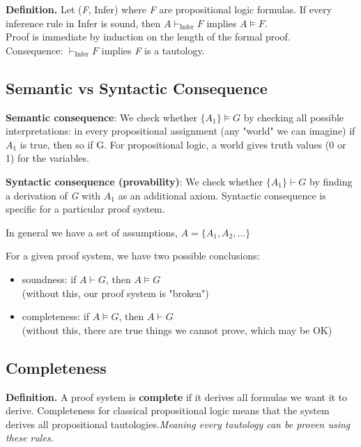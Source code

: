 \documentclass[11pt]{article}
\begin{document}
\begin{tcolorbox}[
    enhanced,
    frame hidden,
    borderline west={2pt}{0pt}{black},
    boxsep=5pt,
    left=8pt
]
\textbf{Definition.} Let (\textit{F}, Infer) where \textit{F} are propositional logic formulas. If every inference rule in Infer is sound, then $A \vdash_{\text{Infer}} F$ implies $A \models F$. \\

Proof is immediate by induction on the length of the formal proof. \\
Consequence: $\vdash_{\text{Infer}} F$ implies \textit{F} is a tautology. 
\end{tcolorbox}

\subsection*{Semantic vs Syntactic Consequence}
\textbf{Semantic consequence}: We check whether $\{ A_1 \} \models G$ by checking all possible interpretations: in every propositional assignment (any "world" we can imagine) if $A_1$ is true, then so if G. For propositional logic, a world gives truth values (0 or 1) for the variables. 

\textbf{Syntactic consequence (provability)}: We check whether $\{ A_1 \} \vdash G$ by finding a derivation of \textit{G} with $A_1$ as an additional axiom. Syntactic consequence is specific for a particular proof system. 

In general we have a set of assumptions, $A = \{A_1, A_2, ...\}$

For a given proof system, we have two possible conclusions:
\begin{itemize}
	\item soundness: if $A \vdash G$, then $A \models G$ \\
	(without this, our proof system is "broken")
	\item completeness: if $A \models G$, then $A \vdash G$ \\
	(without this, there are true things we cannot prove, which may be OK)
\end{itemize}

\subsection*{Completeness}

\begin{tcolorbox}[
    enhanced,
    frame hidden,
    borderline west={2pt}{0pt}{black},
    boxsep=5pt,
    left=8pt
]
\textbf{Definition.} A proof system is \textbf{complete} if it derives all formulas we want it to derive. Completeness for classical propositional logic means that the system derives all propositional tautologies.\emph{Meaning every tautology can be proven using these rules}.

\end{tcolorbox}
\end{document}
